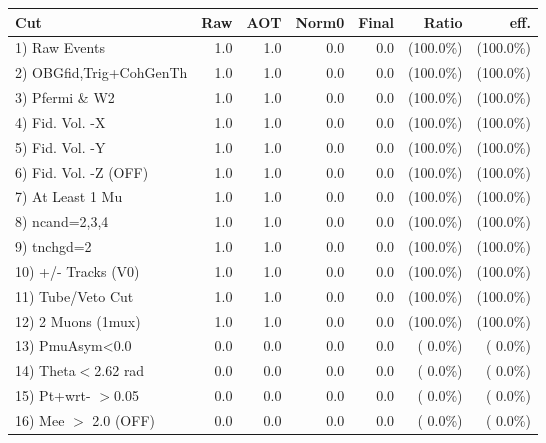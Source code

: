  \begin{table}[h!]\centering
 \begin{tabular}{||l||r|r|r|r|r|r||}
 \hline
 \hline
 Cut & Raw & AOT & Norm0 & Final & Ratio & eff.       \\
 \hline
  1) Raw Events           &          1.0 &          1.0 &          0.0 &          0.0 & (100.0\%) & (100.0\%) \\
  2) OBGfid,Trig+CohGenTh &          1.0 &          1.0 &          0.0 &          0.0 & (100.0\%) & (100.0\%) \\
  3) Pfermi \& W2         &          1.0 &          1.0 &          0.0 &          0.0 & (100.0\%) & (100.0\%) \\
  4) Fid. Vol. -X         &          1.0 &          1.0 &          0.0 &          0.0 & (100.0\%) & (100.0\%) \\
  5) Fid. Vol. -Y         &          1.0 &          1.0 &          0.0 &          0.0 & (100.0\%) & (100.0\%) \\
  6) Fid. Vol. -Z (OFF)   &          1.0 &          1.0 &          0.0 &          0.0 & (100.0\%) & (100.0\%) \\
  7) At Least 1 Mu        &          1.0 &          1.0 &          0.0 &          0.0 & (100.0\%) & (100.0\%) \\
  8) ncand=2,3,4          &          1.0 &          1.0 &          0.0 &          0.0 & (100.0\%) & (100.0\%) \\
  9) tnchgd=2             &          1.0 &          1.0 &          0.0 &          0.0 & (100.0\%) & (100.0\%) \\
 10) +/- Tracks (V0)      &          1.0 &          1.0 &          0.0 &          0.0 & (100.0\%) & (100.0\%) \\
 11) Tube/Veto Cut        &          1.0 &          1.0 &          0.0 &          0.0 & (100.0\%) & (100.0\%) \\
 12) 2 Muons (1mux)       &          1.0 &          1.0 &          0.0 &          0.0 & (100.0\%) & (100.0\%) \\
 13) PmuAsym<0.0          &          0.0 &          0.0 &          0.0 &          0.0 & (  0.0\%) & (  0.0\%) \\
 14) Theta$<$2.62 rad     &          0.0 &          0.0 &          0.0 &          0.0 & (  0.0\%) & (  0.0\%) \\
 15) Pt+wrt- $>$0.05      &          0.0 &          0.0 &          0.0 &          0.0 & (  0.0\%) & (  0.0\%) \\
 16) Mee $>$ 2.0  (OFF)   &          0.0 &          0.0 &          0.0 &          0.0 & (  0.0\%) & (  0.0\%) \\

\end{tabular}
\end{table}
